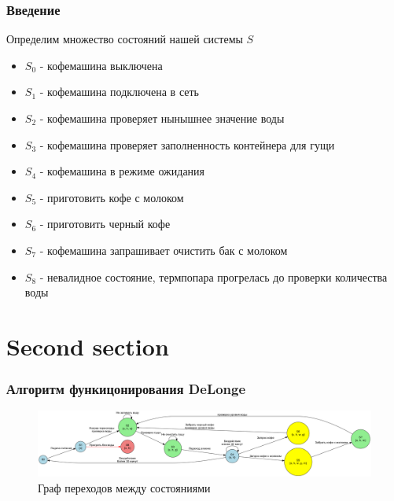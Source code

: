 \documentclass[xcolor={dvipsnames}]{beamer}
\begin{document}
\begin{frame}
\frametitle{Введение}

Определим множество состояний нашей системы $S$

\begin{itemize}
    \item $S_0$ - кофемашина выключена
    \item $S_1$ - кофемашина подключена в сеть
    \item $S_2$ - кофемашина проверяет нынышнее значение воды
    \item $S_3$ - кофемашина проверяет заполненность контейнера для гущи 
    \item $S_4$ - кофемашина в режиме ожидания
    \item $S_5$ - приготовить кофе с молоком
    \item $S_6$ - приготовить черный кофе
    \item $S_7$ - кофемашина запрашивает очистить бак с молоком 
    \item $S_8$ - невалидное состояние, термпопара прогрелась до проверки количества воды
\end{itemize}

\end{frame}


\section{Second section}

\begin{frame}
\frametitle{Алгоритм функицонирования DeLonge}

\begin{figure}[h!]
            \begin{center}
			\includegraphics[width=1.0\linewidth]{pics/coffee.png}
			\caption{Граф переходов между состояниями}
			\end{center}
                \label{graph}
\end{figure}


\end{frame}
\end{document}
